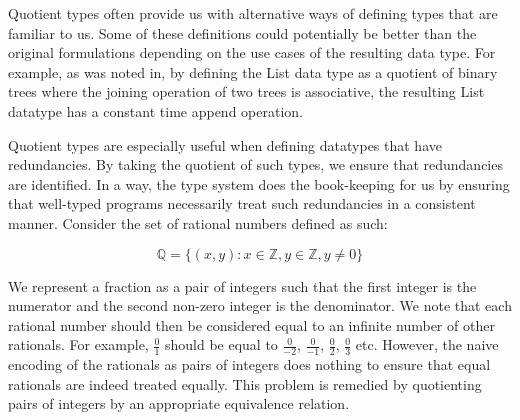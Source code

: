 \documentclass[12pt,twoside,maitrise]{dms}
\theoremstyle{definition}
\numberwithin{equation}{section}
\numberwithin{table}{chapter}
\numberwithin{figure}{chapter}
\begin{document}


Quotient types often provide us with alternative ways of defining types that are
familiar to us. Some of these definitions could potentially be better than the
original formulations depending on the use cases of the resulting data type. For
example, as was noted in\cite{hewer2023quotient}, by defining the List data type
as a quotient of binary trees where the joining operation of two trees is
associative, the resulting List datatype has a constant time append operation.

Quotient types are especially useful when defining datatypes that have
redundancies. By taking the quotient of such types, we ensure that redundancies
are identified. In a way, the type system does the book-keeping for us by
ensuring that well-typed programs necessarily treat such redundancies in a
consistent manner. Consider the set of rational numbers defined as such:

\begin{equation}
\mathbb{Q} = \{(x,y) : x \in \mathbb{Z}, y \in \mathbb{Z}, y \ne 0\}
\end{equation}

We represent a fraction as a pair of integers such that the first integer is the
numerator and the second non-zero integer is the denominator. We note that each
rational number should then be considered equal to an infinite number of other
rationals. For example, $\frac{0}{1}$ should be equal to $\frac{0}{-2}$,
$\frac{0}{-1}$, $\frac{0}{2}$, $\frac{0}{3}$ etc. However, the naive encoding of
the rationals as pairs of integers does nothing to ensure that equal rationals
are indeed treated equally. This problem is remedied by quotienting pairs of
integers by an appropriate equivalence relation.
\end{document}
